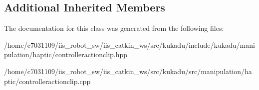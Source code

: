 \subsection*{Additional Inherited Members}


The documentation for this class was generated from the following files\-:\begin{DoxyCompactItemize}
\item 
/home/c7031109/iis\-\_\-robot\-\_\-sw/iis\-\_\-catkin\-\_\-ws/src/kukadu/include/kukadu/manipulation/haptic/controlleractionclip.\-hpp\item 
/home/c7031109/iis\-\_\-robot\-\_\-sw/iis\-\_\-catkin\-\_\-ws/src/kukadu/src/manipulation/haptic/controlleractionclip.\-cpp\end{DoxyCompactItemize}
